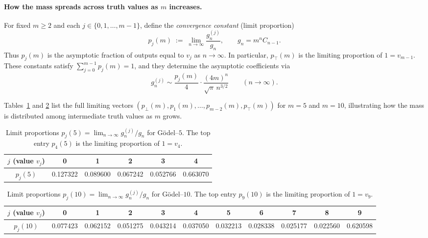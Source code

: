 \documentclass[11pt]{article}
\newcommand{\ptop}{p_{\top}}
\newcommand{\pbot}{p_{\bot}}
\begin{document}
\paragraph{How the mass spreads across truth values as \(m\) increases.}
For fixed \(m\ge2\) and each \(j\in\{0,1,\dots,m-1\}\), define the \emph{convergence constant}
(limit proportion)
\[
p_j(m)\;:=\;\lim_{n\to\infty}\frac{g_n^{(j)}}{g_n},
\qquad
g_n=m^nC_{n-1}.
\]
Thus \(p_j(m)\) is the asymptotic fraction of outputs equal to \(v_j\) as \(n\to\infty\).
In particular, \(\ptop(m)\) is the limiting proportion of \(1=v_{m-1}\).
These constants satisfy \(\sum_{j=0}^{m-1}p_j(m)=1\), and they determine the asymptotic
coefficients via
\[
g_n^{(j)}\sim \frac{p_j(m)}{4}\cdot \frac{(4m)^n}{\sqrt{\pi}\,n^{3/2}}
\qquad (n\to\infty).
\]

Tables~\ref{tab:pvector-m5} and \ref{tab:pvector-m10} list the full limiting vectors
\((\pbot(m),p_1(m),\dots,p_{m-2}(m), \ptop(m))\) for \(m=5\) and \(m=10\), illustrating how the mass
is distributed among intermediate truth values as \(m\) grows.

\begin{table}[H]
\centering
\small
\renewcommand{\arraystretch}{1.05}
\begin{tabular}{c|ccccc}
\hline
\(j\) (value \(v_j\)) & 0 & 1 & 2 & 3 & 4 \\
\hline
\(p_j(5)\) & 0.127322 & 0.089600 & 0.067242 & 0.052766 & 0.663070 \\
\hline
\end{tabular}
\caption{Limit proportions \(p_j(5)=\lim_{n\to\infty} g_n^{(j)}/g_n\) for Gödel--\(5\).  The
top entry \(p_4(5)\) is the limiting proportion of \(1=v_4\).}
\label{tab:pvector-m5}
\end{table}

\begin{table}[H]
\centering
\tiny
\renewcommand{\arraystretch}{1.05}
\begin{tabular}{c|cccccccccc}
\hline
\(j\) (value \(v_j\)) & 0 & 1 & 2 & 3 & 4 & 5 & 6 & 7 & 8 & 9 \\
\hline
\(p_j(10)\) &
0.077423 & 0.062152 & 0.051275 & 0.043214 & 0.037050 &
0.032213 & 0.028338 & 0.025177 & 0.022560 & 0.620598 \\
\hline
\end{tabular}
\caption{Limit proportions \(p_j(10)=\lim_{n\to\infty} g_n^{(j)}/g_n\) for Gödel--\(10\).  The
top entry \(p_9(10)\) is the limiting proportion of \(1=v_9\).}
\label{tab:pvector-m10}
\end{table}
\end{document}
